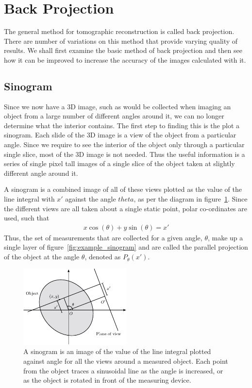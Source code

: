 \section{Back Projection} %
\label{sec:back_projection}
    The general method for tomographic reconstruction is called back projection. There are number of variations on this method that provide varying quality of results. We shall first examine the basic method of back projection and then see how it can be improved to increase the accuracy of the images calculated with it.

    \subsection{Sinogram} %
    \label{sub:sinogram}
        Since we now have a 3D image, such as would be collected when imaging an object from a large number of different angles around it, we can no longer determine what the interior contains. The first step to finding this is the plot a sinogram. Each slide of the 3D image is a view of the object from a particular angle. Since we require to see the interior of the object only through a particular single slice, most of the 3D image is not needed. Thus the useful information is a series of single pixel tall images of a single slice of the object taken at slightly different angle around it.

        A sinogram is a combined image of all of these views plotted as the value of the line integral with $x'$ against the angle $theta$, as per the diagram in figure~\ref{fig:sinogram_diag}. Since the different views are all taken about a single static point, polar co-ordinates are used, such that
        \begin{align}
            x\cos(\theta) + y\sin(\theta) = x'
        \end{align}
        Thus, the set of measurements that are collected for a given angle, $\theta$, make up a single layer of figure~\ref{fig:example_sinogram} and are called the parallel projection of the object at the angle $\theta$, denoted as $P_{\theta}(x')$.
        \begin{figure}[ht]
            \begin{center}
                \includegraphics[width=0.5\textwidth]{Files/report_images/sinogram_diag.pdf}
            \end{center}
            \caption{A sinogram is an image of the value of the line integral plotted against angle for all the views around a measured object. Each point from the object traces a sinusoidal line as the angle is increased, or as the object is rotated in front of the measuring device.\label{fig:sinogram_diag}}
        \end{figure}

